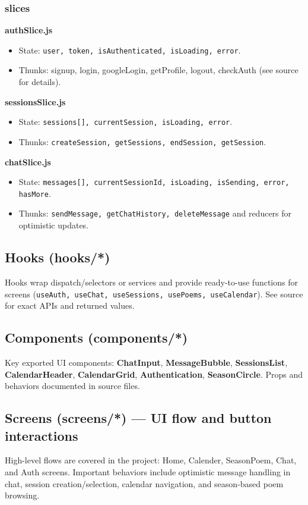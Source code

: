 \documentclass[11pt]{article}
\begin{document}
\subsubsection{slices}
\textbf{authSlice.js}
\begin{itemize}
	\item State: \texttt{user, token, isAuthenticated, isLoading, error}.
	\item Thunks: signup, login, googleLogin, getProfile, logout, checkAuth (see source for details).
\end{itemize}

\textbf{sessionsSlice.js}
\begin{itemize}
	\item State: \texttt{sessions[], currentSession, isLoading, error}.
	\item Thunks: \texttt{createSession, getSessions, endSession, getSession}.
\end{itemize}

\textbf{chatSlice.js}
\begin{itemize}
	\item State: \texttt{messages[], currentSessionId, isLoading, isSending, error, hasMore}.
	\item Thunks: \texttt{sendMessage, getChatHistory, deleteMessage} and reducers for optimistic updates.
\end{itemize}

\subsection{Hooks (hooks/*)}
Hooks wrap dispatch/selectors or services and provide ready-to-use functions for screens (\texttt{useAuth, useChat, useSessions, usePoems, useCalendar}). See source for exact APIs and returned values.

\subsection{Components (components/*)}
Key exported UI components: \textbf{ChatInput}, \textbf{MessageBubble}, \textbf{SessionsList}, \textbf{CalendarHeader}, \textbf{CalendarGrid}, \textbf{Authentication}, \textbf{SeasonCircle}. Props and behaviors documented in source files.

\subsection{Screens (screens/*) — UI flow and button interactions}
High-level flows are covered in the project: Home, Calender, SeasonPoem, Chat, and Auth screens. Important behaviors include optimistic message handling in chat, session creation/selection, calendar navigation, and season-based poem browsing.
\end{document}
